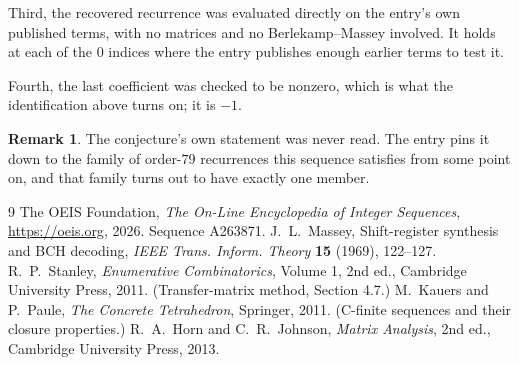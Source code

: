 \documentclass[11pt,a4paper]{article}
\theoremstyle{plain}
\theoremstyle{definition}
\newtheorem{remark}[theorem]{Remark}
\begin{document}
Third, the recovered recurrence was evaluated directly on the entry's own published terms, with
no matrices and no Berlekamp--Massey involved. It holds at each of the $0$ indices where
the entry publishes enough earlier terms to test it.

Fourth, the last coefficient was checked to be nonzero, which is what the identification above
turns on; it is $-1$.

\begin{remark}
The conjecture's own statement was never read. The entry pins it down to the family of
order-$79$ recurrences this sequence satisfies from some point on, and that family turns
out to have exactly one member.
\end{remark}

\begin{thebibliography}{9}
 The OEIS Foundation, \emph{The On-Line Encyclopedia of Integer
Sequences}, \url{https://oeis.org}, 2026. Sequence A263871.
 J.~L.~Massey, Shift-register synthesis and BCH decoding, \emph{IEEE
Trans. Inform. Theory} \textbf{15} (1969), 122--127.
 R.~P.~Stanley, \emph{Enumerative Combinatorics}, Volume 1, 2nd ed.,
Cambridge University Press, 2011. (Transfer-matrix method, Section 4.7.)
 M.~Kauers and P.~Paule, \emph{The Concrete Tetrahedron}, Springer, 2011.
(C-finite sequences and their closure properties.)
 R.~A.~Horn and C.~R.~Johnson, \emph{Matrix Analysis}, 2nd ed., Cambridge
University Press, 2013.
\end{thebibliography}
\end{document}
